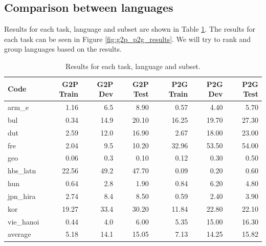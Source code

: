 \documentclass[11pt,a4paper]{article}
\begin{document}
\subsection{Comparison between languages}

Results for each task, language and subset are shown in Table \ref{tab:results}. The results for each task can be seen in Figure \ref{fig:g2p_p2g_results}. We will try to rank and group languages based on the results.

\begin{table}[ht]
\centering
\begin{tabular}{lrrrrrr}
\toprule
      Code &  G2P Train &  G2P Dev &  G2P Test &  P2G Train &  P2G Dev &  P2G Test \\
\midrule
     arm\_e &       1.16 &      6.5 &      8.90 &       0.57 &     4.40 &      5.70 \\
       bul &       0.34 &     14.9 &     20.10 &      16.25 &    19.70 &     27.30 \\
       dut &       2.59 &     12.0 &     16.90 &       2.67 &    18.00 &     23.00 \\
       fre &       2.04 &      9.5 &     10.20 &      32.96 &    53.50 &     54.00 \\
       geo &       0.06 &      0.3 &      0.10 &       0.12 &     0.30 &      0.50 \\
  hbs\_latn &      22.56 &     49.2 &     47.70 &       0.09 &     0.20 &      0.60 \\
       hun &       0.64 &      2.8 &      1.90 &       0.84 &     6.20 &      4.80 \\
  jpn\_hira &       2.74 &      8.4 &      8.50 &       0.59 &     2.40 &      3.90 \\
       kor &      19.27 &     33.4 &     30.20 &      11.84 &    22.80 &     22.10 \\
 vie\_hanoi &       0.44 &      4.0 &      6.00 &       5.35 &    15.00 &     16.30 \\
 \midrule
   average &       5.18 &     14.1 &     15.05 &       7.13 &    14.25 &     15.82 \\
\bottomrule
\end{tabular}
\caption{Results for each task, language and subset.}
\label{tab:results}
\end{table}
\end{document}
